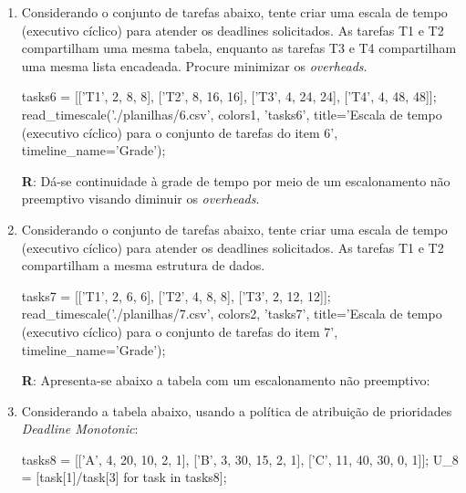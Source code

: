 \documentclass[
	10pt,				%
	openright,			%
	oneside,			%
	a4paper,			%
	english,			%
	french,				%
	spanish,			%
	brazil,				%
	]{abntex2}
\newcommand{\ª}{%
\textordfeminine
}
\begin{document}
\begin{enumerate}
\item Considerando o conjunto de tarefas abaixo, tente criar uma escala de tempo (executivo cíclico) para
atender os deadlines solicitados. As tarefas T1 e T2 compartilham uma mesma tabela, enquanto as
tarefas T3 e T4 compartilham uma mesma lista encadeada. Procure minimizar os \textit{overheads}.

\begin{sagesilent}
tasks6 = [['T1', 2, 8, 8], ['T2', 8, 16, 16], ['T3', 4, 24, 24], ['T4', 4, 48, 48]];
read_timescale('./planilhas/6.csv', colors1, 'tasks6', title='Escala de tempo (executivo cíclico) para o conjunto de tarefas do item 6', timeline_name='Grade');
\end{sagesilent}

\begin{center}
\end{center}
\textbf{R}: Dá-se continuidade à grade de tempo por meio de um escalonamento não preemptivo visando diminuir os \textit{overheads}.
\begin{center}
\end{center}

\item Considerando o conjunto de tarefas abaixo, tente criar uma escala de tempo (executivo cíclico) para
atender os deadlines solicitados. As tarefas T1 e T2 compartilham a mesma estrutura de dados.

\begin{sagesilent}
tasks7 = [['T1', 2, 6, 6], ['T2', 4, 8, 8], ['T3', 2, 12, 12]];
read_timescale('./planilhas/7.csv', colors2, 'tasks7', title='Escala de tempo (executivo cíclico) para o conjunto de tarefas do item 7', timeline_name='Grade');
\end{sagesilent}

\begin{center}
\end{center}
\textbf{R}: Apresenta-se abaixo a tabela com um escalonamento não preemptivo:
\begin{center}
\end{center}

\item Considerando a tabela abaixo, usando a política de atribuição de prioridades \textit{Deadline Monotonic}:

\begin{sagesilent}
tasks8 = [['A', 4, 20, 10, 2, 1], ['B', 3, 30, 15, 2, 1], ['C', 11, 40, 30, 0, 1]];
U_8 = [task[1]/task[3] for task in tasks8];
\end{sagesilent}


\end{enumerate}
\end{document}
